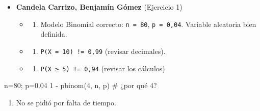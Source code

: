 \documentclass[
  spanish,
  letterpaper,
  DIV=11,
  numbers=noendperiod]{scrreprt}
\newenvironment{Shaded}{\begin{snugshade}}{\end{snugshade}}
\newcommand{\CommentTok}[1]{\textcolor[rgb]{0.37,0.37,0.37}{#1}}
\newcommand{\DecValTok}[1]{\textcolor[rgb]{0.68,0.00,0.00}{#1}}
\newcommand{\FloatTok}[1]{\textcolor[rgb]{0.68,0.00,0.00}{#1}}
\newcommand{\FunctionTok}[1]{\textcolor[rgb]{0.28,0.35,0.67}{#1}}
\newcommand{\NormalTok}[1]{\textcolor[rgb]{0.00,0.23,0.31}{#1}}
\newcommand{\OtherTok}[1]{\textcolor[rgb]{0.00,0.23,0.31}{#1}}
\newcommand{\SpecialCharTok}[1]{\textcolor[rgb]{0.37,0.37,0.37}{#1}}
\providecommand{\tightlist}{%
  \setlength{\itemsep}{0pt}\setlength{\parskip}{0pt}}
\begin{document}
\begin{itemize}
\tightlist
\item
  \textbf{Candela Carrizo, Benjamín Gómez} (Ejercicio 1)

  \begin{itemize}
  \tightlist
  \item
    \begin{enumerate}
    \def\labelenumi{\alph{enumi})}
    \tightlist
    \item
      Modelo Binomial correcto: \texttt{n\ =\ 80}, \texttt{p\ =\ 0,04}.
      Variable aleatoria bien definida.
    \end{enumerate}
  \item
    \begin{enumerate}
    \def\labelenumi{\alph{enumi})}
    \setcounter{enumi}{1}
    \tightlist
    \item
      \texttt{P(X\ =\ 10)\ !=\ 0,99} (revisar decimales).
    \end{enumerate}
  \item
    \begin{enumerate}
    \def\labelenumi{\alph{enumi})}
    \setcounter{enumi}{2}
    \tightlist
    \item
      \texttt{P(X\ ≥\ 5)\ !=\ 0,94} (revisar los cálculos)
    \end{enumerate}
  \end{itemize}
\end{itemize}

\begin{Shaded}
\begin{Highlighting}[]
\NormalTok{n}\OtherTok{=}\DecValTok{80}\NormalTok{; p}\OtherTok{=}\FloatTok{0.04}
\DecValTok{1} \SpecialCharTok{{-}} \FunctionTok{pbinom}\NormalTok{(}\DecValTok{4}\NormalTok{, n, p) }\CommentTok{\# ¿por qué 4?}
\end{Highlighting}
\end{Shaded}

\begin{enumerate}
\def\labelenumi{\alph{enumi})}
\setcounter{enumi}{3}
\tightlist
\item
  No se pidió por falta de tiempo.
\end{enumerate}
\end{document}
